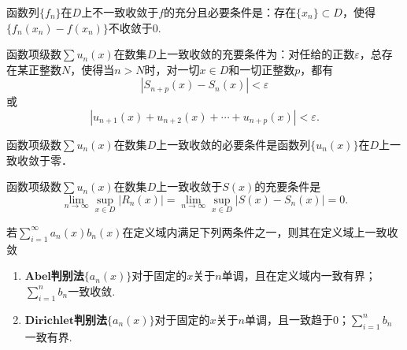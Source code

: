 \documentclass[../../main.tex]{subfiles}%
\begin{document}
\begin{corollary}\label{corollary:函数列不一致收敛的充要条件}
函数列\(\{f_n\}\)在\(D\)上不一致收敛于\(f\)的充分且必要条件是：存在\(\{x_n\} \subset D\)，使得\(\{f_n(x_n) - f(x_n)\}\)不收敛于\(0\).
\end{corollary}

\begin{theorem}[一致收敛的柯西准则]\label{theorem:一致收敛的柯西准则}
函数项级数\(\sum u_n(x)\)在数集\(D\)上一致收敛的充要条件为：对任给的正数\(\varepsilon\)，总存在某正整数\(N\)，使得当\(n > N\)时，对一切\(x \in D\)和一切正整数\(p\)，都有
\[
|S_{n + p}(x) - S_n(x)| < \varepsilon
\]
或
\[
|u_{n + 1}(x) + u_{n + 2}(x) + \cdots + u_{n + p}(x)| < \varepsilon.
\]
\end{theorem}

\begin{corollary}
函数项级数\(\sum u_n(x)\)在数集\(D\)上一致收敛的必要条件是函数列\(\{u_n(x)\}\)在\(D\)上一致收敛于零．
\end{corollary} 

\begin{theorem}
函数项级数\(\sum u_n(x)\)在数集\(D\)上一致收敛于\(S(x)\)的充要条件是
\[
\lim_{n \to \infty} \sup_{x \in D} |R_n(x)| = \lim_{n \to \infty} \sup_{x \in D} |S(x) - S_n(x)| = 0.
\]
\end{theorem}

\begin{theorem}[A-D判别法]\label{theorem:级数一致收敛的A-D判别法}
若\(\sum_{i = 1}^{\infty} a_n(x)b_n(x)\)在定义域内满足下列两条件之一，则其在定义域上一致收敛
\begin{enumerate}[(1)]
\item $\mathbf{Abel}$\textbf{判别法}\(\{a_n(x)\}\)对于固定的\(x\)关于\(n\)单调，且在定义域内一致有界；\(\sum_{i = 1}^{n} b_n\)一致收敛.

\item $\mathbf{Dirichlet}$\textbf{判别法}\(\{a_n(x)\}\)对于固定的\(x\)关于\(n\)单调，且一致趋于\(0\)；\(\sum_{i = 1}^{n} b_n\)一致有界.
\end{enumerate}
\end{theorem}
\end{document}
